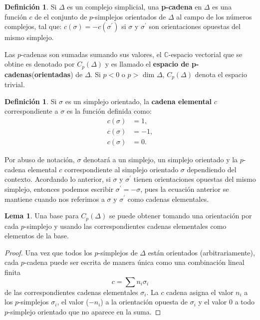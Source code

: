\documentclass[12pt]{book}
\theoremstyle{definition}
\newtheorem{definition}[theorem]{Definición}
\newtheorem{lemma}[theorem]{Lema}
\newcounter{in}
\newcounter{ini}
\begin{document}
\begin{definition}
  \label{p_chain}
  Si $\Delta$ es un complejo simplicial, una \textbf{p-cadena} en
  $\Delta$ es una función $c$ de el conjunto de $p$-simplejos
  orientados de $\Delta$ al campo de los números complejos, tal que:
  $c(\sigma) = -c(\sigma^{'})$ si $\sigma$ y $\sigma^{'}$ son orientaciones
  opuestas del mismo simplejo.
\end{definition}
Las $p$-cadenas son sumadas sumando sus valores, el $\mathbb{C}$-espacio
vectorial que  se obtine es denotado por $C_{p}(\Delta)$ y es llamado el
\textbf{espacio de p-cadenas}(\textbf{orientadas}) de $\Delta$. Si
$p < 0$ o $p > $ dim $\Delta$, $C_{p}(\Delta)$ denota el espacio
trivial.
\begin{definition}
  \label{elementary_chain}
  Si $\sigma$ es un simplejo orientado, la \textbf{cadena elemental}
  $c$ correspondiente a $\sigma$ es la función definida como:
  \begin{equation}
    \label{eq:80}
     \begin{aligned}
    c(\sigma) &= 1,\\
    c(\sigma) &= -1, \\
    c(\sigma) &= 0.
  \end{aligned}
  \end{equation}
\end{definition}
Por abuso de notación, $\sigma$ denotará a un simplejo, un simplejo
orientado y la $p$-cadena elemental $c$ correspondiente al simplejo
orientado $\sigma$ dependiendo del contexto.  Acordando lo anterior,
si $\sigma$ y $\sigma^{'}$ tienen orientaciones opuestas del mismo
simplejo, entonces podemos escribir $\sigma^{'} = -\sigma$, pues la ecuación anterior
se mantiene cuando nos referimos a $\sigma$ y $\sigma^{'}$
como cadenas elementales.

\begin{lemma}
  \label{c_basis}
  Una base para $C_{p}(\Delta)$ se puede obtener tomando una
  orientación por cada $p$-simplejo y usando las correspondientes
  cadenas elementales como elementos de la base.
\end{lemma}

\begin{proof}
  Una vez que todos los $p$-simplejos de $\Delta$ están orientados
  (arbitrariamente), cada $p$-cadena puede ser escrita de manera única
  como una combinación lineal finita
\begin{equation}
  \label{eq:81}
  c = \sum n_{i}\sigma_{i}
\end{equation}
de las correspondientes cadenas elementales $\sigma_{i}$. La $c$ cadena
asigna el valor $n_{i}$ a los $p$-simplejos $\sigma_{i}$, el valor
($-n_{i}$) a la orientación opuesta de $\sigma_{i}$ y el valor $0$ a
todo $p$-simplejo orientado que no aparece en la suma.
\end{proof}
\end{document}
